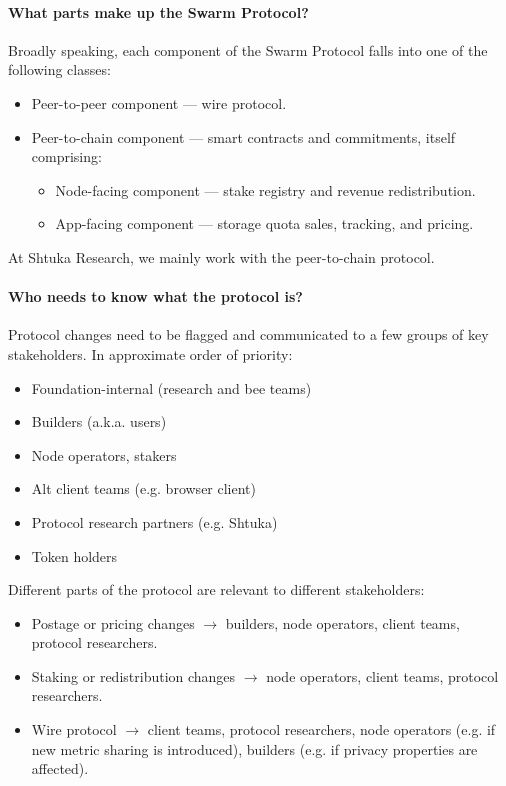 \paragraph{What parts make up the Swarm Protocol?}
Broadly speaking, each component of the Swarm Protocol falls into one of the following classes:
%
\begin{itemize}
  \item Peer-to-peer component — wire protocol.
  \item Peer-to-chain component — smart contracts and commitments, itself comprising:
  \begin{itemize}
    \item Node-facing component — stake registry and revenue redistribution.
    \item App-facing component — storage quota sales, tracking, and pricing.
  \end{itemize}
\end{itemize}
%
At Shtuka Research, we mainly work with the peer-to-chain protocol.

\paragraph{Who needs to know what the protocol is?} Protocol changes need to be flagged and communicated to a few groups of key stakeholders. 
%
In approximate order of priority:

\begin{itemize}
\item Foundation-internal (research and bee teams)
\item Builders (a.k.a. users)
\item Node operators, stakers
\item Alt client teams (e.g. browser client)
\item Protocol research partners (e.g. Shtuka)
\item Token holders  
\end{itemize}

Different parts of the protocol are relevant to different stakeholders:

\begin{itemize}
\item Postage or pricing changes $\rightarrow$ builders, node operators, client teams, protocol researchers.
\item Staking or redistribution changes $\rightarrow$ node operators, client teams, protocol researchers.
\item Wire protocol $\rightarrow$ client teams, protocol researchers, node operators (e.g. if new metric sharing is introduced), builders (e.g. if privacy properties are affected).
\end{itemize}

